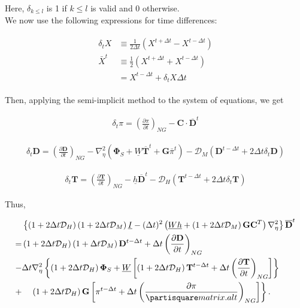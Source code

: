 Here, \(\delta_{k \leq l}\) is 1 if \(k \leq l\) is valid and 0 otherwise.\\
We now use the following expressions for time differences:

\begin{eqnarray}
\begin{aligned}
\delta_{t} X & \equiv \frac{1}{2 \Delta t}\left(X^{t+\Delta t}-X^{t-\Delta t}\right) \\
\bar{X}^{t} & \equiv \frac{1}{2}\left(X^{t+\Delta t}+X^{t-\Delta t}\right) \\
&=X^{t-\Delta t}+\delta_{t} X \Delta t
\end{aligned}
\end{eqnarray}

Then, applying the semi-implicit method to the system of equations, we get

\begin{eqnarray} \delta_{t} \pi =\left(\frac{\partial \pi}{\partial t}\right)_{N G}-\mathbf{C} \cdot \overline{\mathbf{D}}^{t} \label{eq-for-pi} \end{eqnarray}

\begin{eqnarray}
\delta_{t} \mathbf{D} =\left(\frac{\partial \mathbf{D}}{\partial t}\right)_{N G}-\nabla_{\eta}^{2}\left(\mathbf{\Phi}_{S}+\underline{W} \overline{\mathbf{T}}^{t}+\mathbf{G} \bar{\pi}^{t}\right)-\mathcal{D}_{M}\left(\mathbf{D}^{t-\Delta t}+2 \Delta t \delta_{t} \mathbf{D}\right)
\end{eqnarray}

\begin{eqnarray}
\delta_{t} \mathbf{T} =\left(\frac{\partial \mathbf{T}}{\partial t}\right)_{N G}-\underline{h} \overline{\mathbf{D}}^{t}-\mathcal{D}_{H}\left(\mathbf{T}^{t-\Delta t}+2 \Delta t \delta_{t} \mathbf{T}\right)
\label{eq-for-t}
\end{eqnarray}

Thus,

\begin{eqnarray}
\begin{aligned}
&\left\{\left(1+2 \Delta t \mathcal{D}_{H}\right)\left(1+2 \Delta t \mathcal{D}_{M}\right) \underline{I}-(\Delta t)^{2}\left(\underline{W} \underline{h}+\left(1+2 \Delta t \mathcal{D}_{M}\right) \mathbf{G} \mathbf{C}^{T}\right) \nabla_{\eta}^{2}\right\} \overline{\mathbf{D}}^{t} \\
=&\left(1+2 \Delta t \mathcal{D}_{H}\right)\left(1+\Delta t \mathcal{D}_{M}\right) \mathbf{D}^{t-\Delta t}+\Delta t\left(\frac{\partial \mathbf{D}}{\partial t}\right)_{N G} \\
-& \Delta t \nabla_{\eta}^{2}\left\{\left(1+2 \Delta t \mathcal{D}_{H}\right) \mathbf{\Phi}_{S}+\underline{W}\left[\left(1+2 \Delta t \mathcal{D}_{H}\right) \mathbf{T}^{t-\Delta t}+\Delta t\left(\frac{\partial \mathbf{T}}{\partial t}\right)_{N G}\right]\right\} \\
+&\left.\quad\left(1+2 \Delta t \mathcal{D}_{H}\right) \mathbf{G}\left[\pi^{t-\Delta t}+\Delta t\left(\frac{\partial \pi}{\partisquare matrix. al t}\right)_{N G}\right]\right\}.
\end{aligned}
\end{eqnarray}

